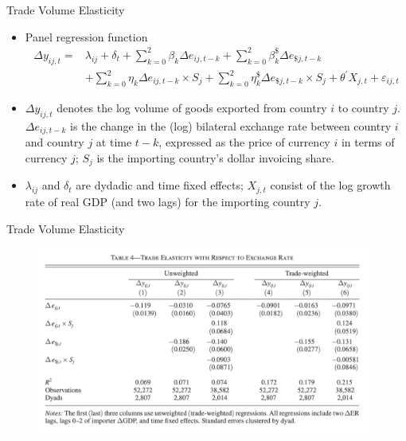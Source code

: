 \documentclass{beamer}
\begin{document}
\begin{frame}{Trade Volume Elasticity}
\begin{itemize}
    \item Panel regression function
    \begin{equation*}
        \begin{aligned}
            \Delta y_{i j, t}= &\lambda_{i j}+\delta_{t}+\sum_{k=0}^{2} \beta_{k} \Delta e_{i j, t-k}+\sum_{k=0}^{2} \beta_{k}^{\$} \Delta e_{\$ j, t-k}\\
            &+\sum^{2}_{k=0} \eta_{k} \Delta e_{i j, t-k} \times S_{j}+\sum^{2}_{k=0} \eta_{k}^{\$} \Delta e_{\$ j, t-k} \times S_{j}+\theta^{\prime} X_{j, t}+\varepsilon_{i j, t}
        \end{aligned}
    \end{equation*}
    \item $\Delta y_{ij,t}$ denotes the log volume of goods exported from country $i$ to country $j$. $\Delta e_{i j, t-k}$ is the change in the (log) bilateral exchange rate between country $i$ and country $j$ at time $t-k$, expressed as the price of currency $i$ in terms of currency $j$; $S_j$ is the importing country's dollar invoicing share.
    \item $\lambda_{ij}$ and $\delta_t$ are dydadic and time fixed effects; $X_{j,t}$ consist of the log growth rate of real GDP (and two lags) for the importing country $j$.
\end{itemize}
\end{frame}
\begin{frame}{Trade Volume Elasticity}
    \begin{figure}[htp]
        \centering
        \includegraphics[width=11cm]{Table4.png}
    \end{figure}
\end{frame}
\end{document}
